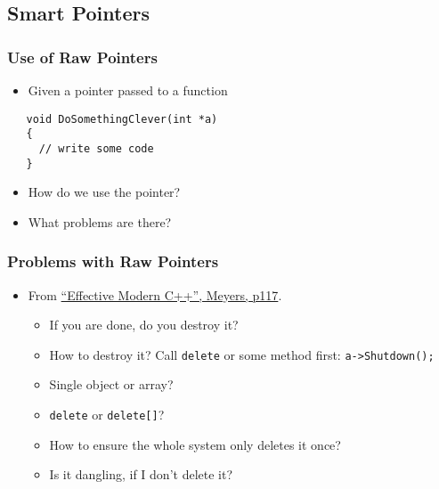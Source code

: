 \hypertarget{smart-pointers}{%
\subsection{Smart Pointers}\label{smart-pointers}}

\hypertarget{use-of-raw-pointers}{%
\subsubsection{Use of Raw Pointers}\label{use-of-raw-pointers}}

\begin{itemize}
\tightlist
\item
  Given a pointer passed to a function
\end{itemize}

\begin{verbatim}
   void DoSomethingClever(int *a) 
   {
     // write some code
   }
\end{verbatim}

\begin{itemize}
\tightlist
\item
  How do we use the pointer?
\item
  What problems are there?
\end{itemize}

\hypertarget{problems-with-raw-pointers}{%
\subsubsection{Problems with Raw
Pointers}\label{problems-with-raw-pointers}}

\begin{itemize}
\tightlist
\item
  From
  \href{https://www.amazon.co.uk/Effective-Modern-Specific-Ways-Improve/dp/1491903996/ref=sr_1_1?ie=UTF8\&qid=1484571499\&sr=8-1\&keywords=Effective+Modern+C\%2B\%2B}{``Effective
  Modern C++'', Meyers, p117}.

  \begin{itemize}
  \tightlist
  \item
    If you are done, do you destroy it?
  \item
    How to destroy it? Call \texttt{delete} or some method first:
    \texttt{a-\textgreater{}Shutdown();}
  \item
    Single object or array?
  \item
    \texttt{delete} or \texttt{delete{[}{]}}?
  \item
    How to ensure the whole system only deletes it once?
  \item
    Is it dangling, if I don't delete it?
  \end{itemize}
\end{itemize}

